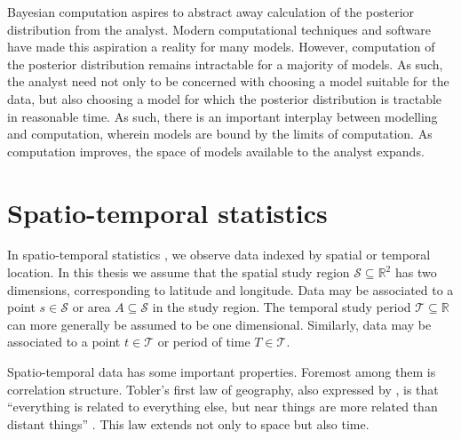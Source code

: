 \documentclass[a4paper, nobind]{templates/ociamthesis}
\begin{document}
Bayesian computation aspires to abstract away calculation of the posterior distribution from the analyst.
Modern computational techniques and software have made this aspiration a reality for many models.
However, computation of the posterior distribution remains intractable for a majority of models.
As such, the analyst need not only to be concerned with choosing a model suitable for the data, but also choosing a model for which the posterior distribution is tractable in reasonable time.
As such, there is an important interplay between modelling and computation, wherein models are bound by the limits of computation.
As computation improves, the space of models available to the analyst expands.

\hypertarget{spatio-temporal-statistics}{%
\section{Spatio-temporal statistics}\label{spatio-temporal-statistics}}

In spatio-temporal statistics \autocite{cressie2015statistics}, we observe data indexed by spatial or temporal location.
In this thesis we assume that the spatial study region \(\mathcal{S} \subseteq \mathbb{R}^2\) has two dimensions, corresponding to latitude and longitude.
Data may be associated to a point \(s \in \mathcal{S}\) or area \(A \subseteq \mathcal{S}\) in the study region.
The temporal study period \(\mathcal{T} \subseteq \mathbb{R}\) can more generally be assumed to be one dimensional.
Similarly, data may be associated to a point \(t \in \mathcal{T}\) or period of time \(T \in \mathcal{T}\).

Spatio-temporal data has some important properties.
Foremost among them is correlation structure.
Tobler's first law of geography, also expressed by \textcite{fisher1936design}, is that ``everything is related to everything else, but near things are more related than distant things'' \autocite{tobler1970computer}.
This law extends not only to space but also time.
\end{document}
